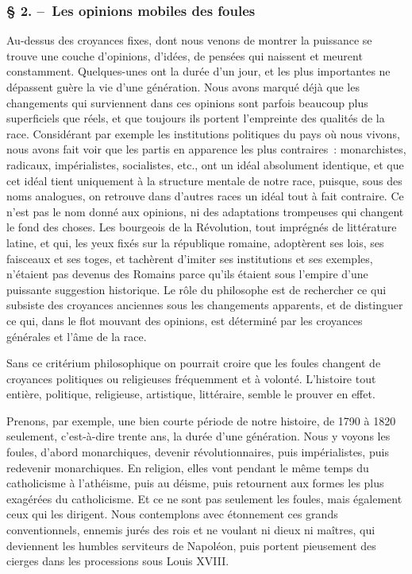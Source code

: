 \documentclass[french,twoside]{book} %
\begin{document}
\subsubsection[{§ 2. – Les opinions mobiles des foules}]{§ 2. – Les opinions mobiles des foules}
\noindent Au-dessus des croyances fixes, dont nous venons de montrer la puissance se trouve une couche d’opinions, d’idées, de pensées qui naissent et meurent constam­ment. Quelques-unes ont la durée d’un jour, et les plus importantes ne dépassent guère la vie d’une génération. Nous avons marqué déjà que les changements qui surviennent dans ces opinions sont parfois beaucoup plus superficiels que réels, et que toujours ils portent l’empreinte des qualités de la race. Considérant par exemple les institutions politiques du pays où nous vivons, nous avons fait voir que les partis en apparence les plus contraires : monarchistes, radicaux, impérialistes, socialistes, etc., ont un idéal absolument identique, et que cet idéal tient uniquement à la structure mentale de notre race, puisque, sous des noms analogues, on retrouve dans d’autres races un idéal tout à fait contraire. Ce n’est pas le nom donné aux opinions, ni des adaptations trompeu­ses qui changent le fond des choses. Les bourgeois de la Révolution, tout imprégnés de littérature latine, et qui, les yeux fixés sur la république romaine, adoptèrent ses lois, ses faisceaux et ses toges, et tachèrent d’imiter ses institutions et ses exemples, n’étaient pas devenus des Romains parce qu’ils étaient sous l’empire d’une puissante suggestion historique. Le rôle du philosophe est de rechercher ce qui subsiste des croyances anciennes sous les changements apparents, et de distinguer ce qui, dans le flot mouvant des opinions, est déterminé par les croyances générales et l’âme de la race.\par
Sans ce critérium philosophique on pourrait croire que les foules changent de croyances politiques ou religieuses fréquemment et à volonté. L’histoire tout entière, politique, religieuse, artistique, littéraire, semble le prouver en effet.\par
Prenons, par exemple, une bien courte période de notre histoire, de 1790 à 1820 seulement, c’est-à-dire trente ans, la durée d’une génération. Nous y voyons les foules, d’abord monarchiques, devenir révolutionnaires, puis impérialistes, puis redevenir monarchiques. En religion, elles vont pendant le même temps du catholicisme à l’athéisme, puis au déisme, puis retournent aux formes les plus exagérées du catho­licisme. Et ce ne sont pas seulement les foules, mais également ceux qui les dirigent. Nous contemplons avec étonnement ces grands conventionnels, ennemis jurés des rois et ne voulant ni dieux ni maîtres, qui deviennent les humbles serviteurs de Napoléon, puis portent pieusement des cierges dans les processions sous Louis XVIII.\par
\end{document}

